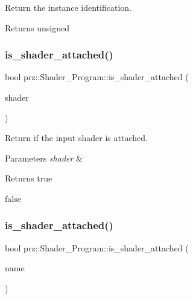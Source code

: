 Return the instance identification. 

\begin{DoxyReturn}{Returns}
unsigned 
\end{DoxyReturn}
\mbox{\label{classprz_1_1_shader___program_adacc3a06016c7950b3099a753f7f8570}} 
\subsubsection{\texorpdfstring{is\_shader\_attached()}{is\_shader\_attached()}\hspace{0.1cm}{\footnotesize\ttfamily [1/2]}}
{\footnotesize\ttfamily bool prz\+::\+Shader\+\_\+\+Program\+::is\+\_\+shader\+\_\+attached (\begin{DoxyParamCaption}\item[{P\+S\+Ptr$<$ \mbox{\hyperlink{classprz_1_1_shader}{Shader}} $>$}]{shader }\end{DoxyParamCaption})\hspace{0.3cm}{\ttfamily [inline]}}



Return if the input shader is attached. 


\begin{DoxyParams}{Parameters}
{\em shader} & \\
\hline
\end{DoxyParams}
\begin{DoxyReturn}{Returns}
true 

false 
\end{DoxyReturn}
\mbox{\label{classprz_1_1_shader___program_aa23dbf1cfa870b98ac1afad31e4a15bc}} 
\subsubsection{\texorpdfstring{is\_shader\_attached()}{is\_shader\_attached()}\hspace{0.1cm}{\footnotesize\ttfamily [2/2]}}
{\footnotesize\ttfamily bool prz\+::\+Shader\+\_\+\+Program\+::is\+\_\+shader\+\_\+attached (\begin{DoxyParamCaption}\item[{const P\+String \&}]{name }\end{DoxyParamCaption})\hspace{0.3cm}{\ttfamily [inline]}}




